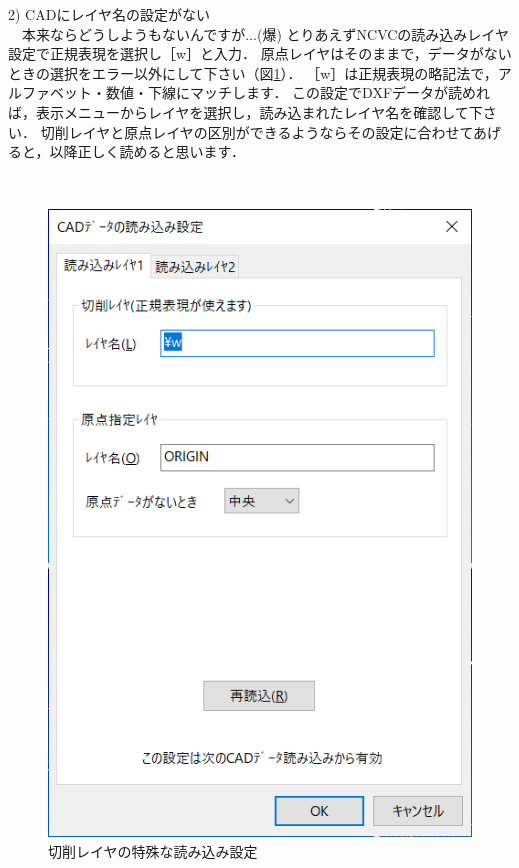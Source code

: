 \begin{minipage}[t]{0.48\textwidth}
2) CADにレイヤ名の設定がない\\
　本来ならどうしようもないんですが...(爆)
とりあえずNCVCの読み込みレイヤ設定で正規表現を選択し［\yen{}w］と入力．
原点レイヤはそのままで，データがないときの選択をエラー以外にして下さい（図\ref{fig:ReadSetupFAQ.png}）．
［\yen{}w］は正規表現の略記法で，アルファベット・数値・下線にマッチします．
この設定でDXFデータが読めれば，表示メニューからレイヤを選択し，読み込まれたレイヤ名を確認して下さい．
切削レイヤと原点レイヤの区別ができるようならその設定に合わせてあげると，以降正しく読めると思います．
\end{minipage}
\begin{minipage}[t]{0.02\textwidth}
　
\end{minipage}
\begin{minipage}[t]{0.5\textwidth}
\vspace*{-2zh}
\begin{figure}[H]
\centering
\includegraphics[width=\textwidth]{No7/fig/ReadSetupFAQ.png}
\caption{切削レイヤの特殊な読み込み設定}
\label{fig:ReadSetupFAQ.png}
\end{figure}
\end{minipage}

